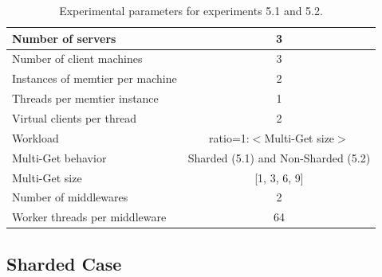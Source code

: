     \begin{table}
        \scriptsize{
            \begin{tabular}{|l|c|}
                \hline Number of servers                & 3 \\
                \hline Number of client machines        & 3 \\
                \hline Instances of memtier per machine & 2 \\
                \hline Threads per memtier instance     & 1 \\
                \hline Virtual clients per thread       & 2 \\
                \hline Workload                         & ratio=1:$<$Multi-Get size$>$ \\
                \hline Multi-Get behavior               & Sharded (5.1) and Non-Sharded (5.2) \\
                \hline Multi-Get size                   & [1, 3, 6, 9] \\
                \hline Number of middlewares            & 2 \\
                \hline Worker threads per middleware    & 64 \\
                \hline
            \end{tabular}
        }
            \caption{Experimental parameters for experiments 5.1 and 5.2.\label{tab:50_setup}}
    \end{table}

    \subsection{Sharded Case\label{subsec:5_sharded}}


